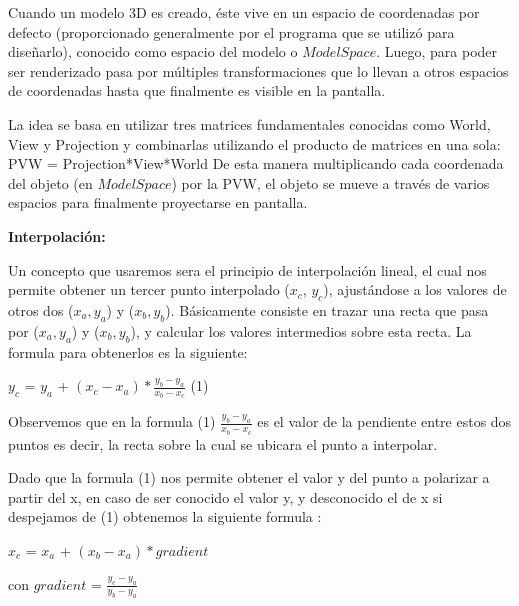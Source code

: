 \documentclass[a4paper]{article}
\begin{document}
\par Cuando un modelo 3D es creado, éste vive en un espacio de coordenadas por defecto (proporcionado generalmente por el programa que se utilizó para diseñarlo), conocido como espacio del modelo o $Model Space$. Luego, para poder ser renderizado pasa por múltiples transformaciones que lo llevan a otros espacios de coordenadas hasta que finalmente es visible en la pantalla. 
\par La idea se basa en utilizar tres matrices fundamentales conocidas como World, View y Projection y combinarlas utilizando el producto de matrices en una sola: 
PVW = Projection*View*World
De esta manera  multiplicando cada coordenada del objeto (en $Model Space$) por la PVW, el objeto se mueve a través de varios espacios para finalmente proyectarse en pantalla.

\textbf{Interpolación:}


Un concepto que usaremos sera el principio de interpolación lineal,  el cual nos permite obtener un tercer punto interpolado ($x_c$, $y_c$),  ajustándose a los valores de otros dos ($x_a, y_a$) y ($x_b, y_b$). Básicamente consiste en trazar una recta que pasa por ($x_a,y_a$) y ($x_b,y_b$), y calcular los valores intermedios sobre esta recta. La formula para obtenerlos es la siguiente:

$y_c$ = $y_a$ + $(x_c - x_a)*\frac{y_b - y_a}{x_b - x_c}$  (1)

Observemos que en la formula (1) $\frac{y_b - y_a}{x_b - x_c}$ es el valor de la  pendiente entre estos dos puntos es decir, la recta sobre la cual se ubicara el punto a interpolar. 
\par Dado que la formula (1) nos permite obtener el valor y del punto a polarizar a partir del x, en caso de ser conocido el valor y, y desconocido el de x si despejamos de (1) obtenemos la siguiente formula :

$x_c$ = $x_a$ + $(x_b - x_a)*gradient$ 

con $gradient$  = $\frac{y_c - y_a}{y_b - y_a}$

 
\end{document}

